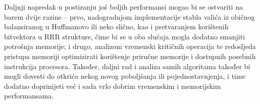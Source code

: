 \documentclass[a4paper,12pt]{article}
\begin{document}
Daljnji napredak u postizanju još boljih performansi mogao bi se ostvariti na barem dvije razine -- prvo, nadogradnjom implementacije stabla valića iz običnog balansiranog u Huffmanovo ili neko slično, kao i pretvaranjem korištenih bitvektora u RRR strukture, čime bi se u oba slučaja mogla dodatno smanjiti potrošnja memorije; i drugo, analizom vremenski kritičnih operacija te redosljeda pristupa memoriji optimizirati korištenje priručne memorije i dostupnih posebnih instrukcija procesora. Također, daljni rad i analiza samih algoritama također bi mogli dovesti do otkrića nekog novog poboljšanja ili pojednostavnjenja, i time dodatno doprinijeti već i sada vrlo dobrim vremenskim i memorijskim performansama.




\end{document}
